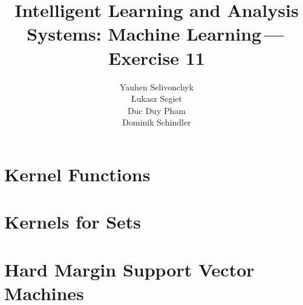 \documentclass[a4paper]{article}
\newcommand{\exnumber}{11}
\begin{document}
\title{Intelligent Learning and Analysis Systems: Machine Learning\,---\,Exercise \exnumber}
\author{Yauhen Selivonchyk\\ {\L}ukasz Segiet\\Duc Duy Pham\\Dominik Schindler}

\maketitle

\section{Kernel Functions}





\section{Kernels for Sets}


\section{Hard Margin Support Vector Machines}




\end{document}
